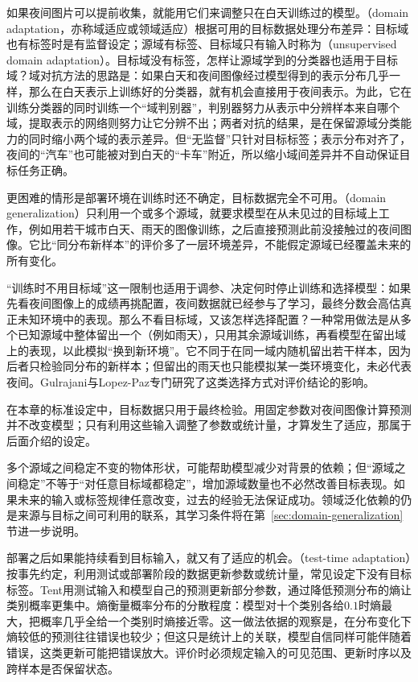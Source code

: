 如果夜间图片可以提前收集，就能用它们来调整只在白天训练过的模型。（domain adaptation，亦称域适应或领域适应）根据可用的目标数据处理分布差异：目标域也有标签时是有监督设定；源域有标签、目标域只有输入时称为（unsupervised domain adaptation）。目标域没有标签，怎样让源域学到的分类器也适用于目标域？域对抗方法的思路是：如果白天和夜间图像经过模型得到的表示分布几乎一样，那么在白天表示上训练好的分类器，就有机会直接用于夜间表示。为此，它在训练分类器的同时训练一个“域判别器”，判别器努力从表示中分辨样本来自哪个域，提取表示的网络则努力让它分辨不出；两者对抗的结果，是在保留源域分类能力的同时缩小两个域的表示差异。但“无监督”只针对目标标签；表示分布对齐了，夜间的“汽车”也可能被对到白天的“卡车”附近，所以缩小域间差异并不自动保证目标任务正确。

更困难的情形是部署环境在训练时还不确定，目标数据完全不可用。（domain generalization）只利用一个或多个源域，就要求模型在从未见过的目标域上工作，例如用若干城市白天、雨天的图像训练，之后直接预测此前没接触过的夜间图像。它比“同分布新样本”的评价多了一层环境差异，不能假定源域已经覆盖未来的所有变化。

“训练时不用目标域”这一限制也适用于调参、决定何时停止训练和选择模型：如果先看夜间图像上的成绩再挑配置，夜间数据就已经参与了学习，最终分数会高估真正未知环境中的表现。那么不看目标域，又该怎样选择配置？一种常用做法是从多个已知源域中整体留出一个（例如雨天），只用其余源域训练，再看模型在留出域上的表现，以此模拟“换到新环境”。它不同于在同一域内随机留出若干样本，因为后者只检验同分布的新样本；但留出的雨天也只能模拟某一类环境变化，未必代表夜间。Gulrajani与Lopez-Paz专门研究了这类选择方式对评价结论的影响。

在本章的标准设定中，目标数据只用于最终检验。用固定参数对夜间图像计算预测并不改变模型；只有利用这些输入调整了参数或统计量，才算发生了适应，那属于后面介绍的设定。

多个源域之间稳定不变的物体形状，可能帮助模型减少对背景的依赖；但“源域之间稳定”不等于“对任意目标域都稳定”，增加源域数量也不必然改善目标表现。如果未来的输入或标签规律任意改变，过去的经验无法保证成功。领域泛化依赖的仍是来源与目标之间可利用的联系，其学习条件将在第~\ref{sec:domain-generalization}节进一步说明。

部署之后如果能持续看到目标输入，就又有了适应的机会。（test-time adaptation）按事先约定，利用测试或部署阶段的数据更新参数或统计量，常见设定下没有目标标签。Tent用测试输入和模型自己的预测更新部分参数，通过降低预测分布的熵让类别概率更集中。熵衡量概率分布的分散程度：模型对十个类别各给$0.1$时熵最大，把概率几乎全给一个类别时熵接近零。这一做法依据的观察是，在分布变化下熵较低的预测往往错误也较少；但这只是统计上的关联，模型自信同样可能伴随着错误，这类更新可能把错误放大。评价时必须规定输入的可见范围、更新时序以及跨样本是否保留状态。

